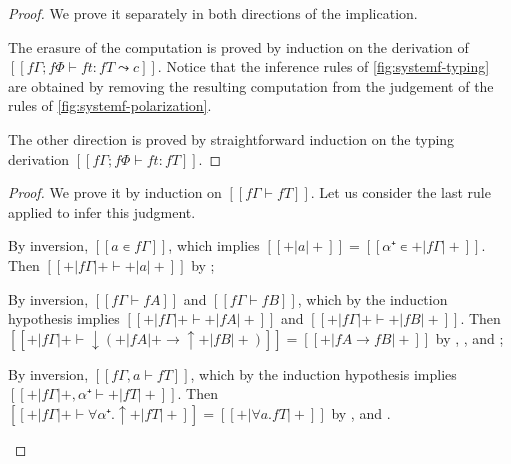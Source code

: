 \lemmaPolRemovable*
\begin{proof}
  We prove it separately in both directions of the implication. 

  The erasure of the computation is proved by
   induction on the derivation of $[[fΓ ; fΦ ⊢ ft : fT ⤳ c]]$.
  Notice that the inference rules of \cref{fig:systemf-typing}
  are obtained by removing the resulting computation from the judgement of the 
  rules of \cref{fig:systemf-polarization}.

  The other direction is proved by straightforward 
  induction on the typing derivation $[[fΓ ; fΦ ⊢ ft : fT]]$.
\end{proof}

\lemmaTypPolWf*
\begin{proof}
  We prove it by induction on $[[fΓ ⊢ fT]]$.
  Let us consider the last rule applied to infer this judgment.
  \begin{caseof}
    \item {}
      By inversion, $[[a ∊ fΓ]]$, 
      which implies $[[+|a|+]] = [[α⁺ ∊ +|fΓ|+]]$.
      Then $[[+|fΓ|+ ⊢ +|a|+ ]]$
      by ;
    \item {}
      By inversion,  $[[fΓ ⊢ fA]]$ and $[[fΓ ⊢ fB]]$,
      which by the induction hypothesis implies $[[+|fΓ|+ ⊢ +|fA|+]]$ and $[[+|fΓ|+ ⊢ +|fB|+]]$.
      Then $[[+|fΓ|+ ⊢ ↓(+|fA|+ → ↑+|fB|+)]] = [[+|fA → fB|+]]$ by 
      ,
      , and
      ;
    \item {}
      By inversion, $[[fΓ, a ⊢ fT]]$,
      which by the induction hypothesis implies $[[+|fΓ|+, α⁺ ⊢ +|fT|+]]$.
      Then $[[+|fΓ|+ ⊢ ∀α⁺.↑+|fT|+]] = [[+|∀a.fT|+]]$ by 
      , and .
  \end{caseof}
\end{proof}


